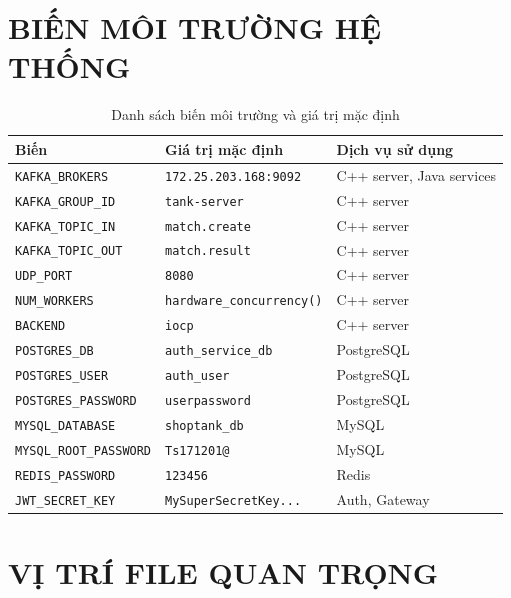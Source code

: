 \documentclass[12pt,a4paper]{report}
\begin{document}
\chapter{BIẾN MÔI TRƯỜNG HỆ THỐNG}

\begin{table}[H]
\centering
\caption{Danh sách biến môi trường và giá trị mặc định}
\label{tab:envvars}
\begin{tabularx}{\textwidth}{llX}
\toprule
\textbf{Biến} & \textbf{Giá trị mặc định} & \textbf{Dịch vụ sử dụng} \\
\midrule
\texttt{KAFKA\_BROKERS}        & \texttt{172.25.203.168:9092}     & C++ server, Java services \\
\texttt{KAFKA\_GROUP\_ID}      & \texttt{tank-server}             & C++ server \\
\texttt{KAFKA\_TOPIC\_IN}      & \texttt{match.create}            & C++ server \\
\texttt{KAFKA\_TOPIC\_OUT}     & \texttt{match.result}            & C++ server \\
\texttt{UDP\_PORT}             & \texttt{8080}                    & C++ server \\
\texttt{NUM\_WORKERS}          & \texttt{hardware\_concurrency()} & C++ server \\
\texttt{BACKEND}               & \texttt{iocp}                    & C++ server \\
\texttt{POSTGRES\_DB}          & \texttt{auth\_service\_db}       & PostgreSQL \\
\texttt{POSTGRES\_USER}        & \texttt{auth\_user}              & PostgreSQL \\
\texttt{POSTGRES\_PASSWORD}    & \texttt{userpassword}            & PostgreSQL \\
\texttt{MYSQL\_DATABASE}       & \texttt{shoptank\_db}            & MySQL \\
\texttt{MYSQL\_ROOT\_PASSWORD} & \texttt{Ts171201@}               & MySQL \\
\texttt{REDIS\_PASSWORD}       & \texttt{123456}                  & Redis \\
\texttt{JWT\_SECRET\_KEY}      & \texttt{MySuperSecretKey...}     & Auth, Gateway \\
\bottomrule
\end{tabularx}
\end{table}

\chapter{VỊ TRÍ FILE QUAN TRỌNG}
\end{document}
